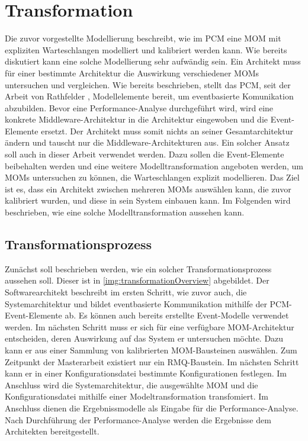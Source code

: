 
\chapter{Transformation}
\label{ch:transformation}
Die zuvor vorgestellte Modellierung beschreibt, wie im PCM eine MOM mit expliziten Warteschlangen modelliert und kalibriert werden kann. Wie bereits diskutiert kann eine solche Modellierung sehr aufwändig sein. Ein Architekt muss für einer bestimmte Architektur die Auswirkung verschiedener MOMs untersuchen und vergleichen. Wie bereits beschrieben, stellt das PCM, seit der Arbeit von Rathfelder \cite{Rathfelder2013}, Modellelemente bereit, um eventbasierte Komunikation abzubilden. Bevor eine Performance-Analyse durchgeführt wird, wird eine konkrete Middleware-Architektur in die Architektur eingewoben und die Event-Elemente ersetzt. Der Architekt muss somit nichts an seiner Gesamtarchitektur ändern und tauscht nur die Middleware-Architekturen aus. Ein solcher Ansatz soll auch in dieser Arbeit verwendet werden. Dazu sollen die Event-Elemente beibehalten werden und eine weitere Modelltransformation angeboten werden, um MOMs untersuchen zu können, die Warteschlangen explizit modellieren. Das Ziel ist es, dass ein Architekt zwischen mehreren MOMs auswählen kann, die zuvor kalibriert wurden, und diese in sein System einbauen kann. Im Folgenden wird beschrieben, wie eine solche Modelltransformation aussehen kann.
\section{Transformationsprozess}
Zunächst soll beschrieben werden, wie ein solcher Transformationsprozess aussehen soll. Dieser ist in \autoref{img:transformationOverview} abgebildet. Der Softwarearchitekt beschreibt im ersten Schritt, wie zuvor auch, die Systemarchitektur und bildet eventbasierte Kommunikation mithilfe der PCM-Event-Elemente ab. Es können auch bereits erstellte Event-Modelle verwendet werden. Im nächsten Schritt muss er sich für eine verfügbare MOM-Architektur entscheiden, deren Auswirkung auf das System er untersuchen möchte. Dazu kann er aus einer Sammlung von kalibrierten MOM-Bausteinen auswählen. Zum Zeitpunkt der Masterarbeit existiert nur ein RMQ-Baustein. Im nächsten Schritt kann er in einer Konfigurationsdatei bestimmte Konfigurationen festlegen. Im Anschluss wird die Systemarchitektur, die ausgewählte MOM und die Konfigurationsdatei mithilfe einer Modeltransformation transfomiert. Im Anschluss dienen die Ergebnissmodelle als Eingabe für die Performance-Analyse. Nach Durchführung der Performance-Analyse werden die Ergebnisse dem Architekten bereitgestellt.

